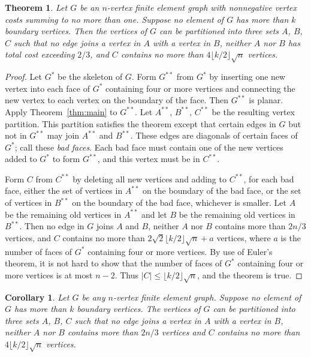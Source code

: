 \documentclass[12pt]{article}
\newtheorem{theorem}{Theorem}
\newtheorem{corollary}{Corollary}
\theoremstyle{remark}
\begin{document}
\begin{theorem}
\label{thm:finite-element}
Let $G$ be an $n$-vertex finite element graph with nonnegative vertex costs summing
to no more than one. Suppose no element of $G$ has more than $k$ boundary vertices.
Then the vertices of $G$ can be partitioned into three sets $A$, $B$, $C$ such that
no edge joins a vertex in $A$ with a vertex in $B$, neither $A$ nor $B$ has total
cost exceeding $2/3$, and $C$ contains no more than $4\lfloor k/2 \rfloor\sqrt{n}$
vertices.
\end{theorem}

\begin{proof}
Let $G^*$ be the skeleton of $G$. Form $G^{**}$ from $G^*$ by inserting one new
vertex into each face of $G^*$ containing four or more vertices and connecting the
new vertex to each vertex on the boundary of the face. Then $G^{**}$ is planar.
Apply Theorem~\ref{thm:main} to $G^{**}$. Let $A^{**}$, $B^{**}$, $C^{**}$ be the
resulting vertex partition. This partition satisfies the theorem except that certain
edges in $G$ but not in $G^{**}$ may join $A^{**}$ and $B^{**}$. These edges are
diagonals of certain faces of $G^*$; call these \emph{bad faces}. Each bad face must
contain one of the new vertices added to $G^*$ to form $G^{**}$, and this vertex
must be in $C^{**}$.

Form $C$ from $C^{**}$ by deleting all new vertices and adding to $C^{**}$, for
each bad face, either the set of vertices in $A^{**}$ on the boundary of the bad
face, or the set of vertices in $B^{**}$ on the boundary of the bad face, whichever
is smaller. Let $A$ be the remaining old vertices in $A^{**}$ and let $B$ be the
remaining old vertices in $B^{**}$. Then no edge in $G$ joins $A$ and $B$, neither
$A$ nor $B$ contains more than $2n/3$ vertices, and $C$ contains no more than
$2\sqrt{2}\lfloor k/2\rfloor\sqrt{n} + a$ vertices, where $a$ is the number of faces
of $G^*$ containing four or more vertices. By use of Euler's theorem, it is not hard
to show that the number of faces of $G^*$ containing four or more vertices is at most
$n - 2$. Thus $|C| \leq \lfloor k/2\rfloor\sqrt{n}$, and the theorem is true.
\end{proof}

\begin{corollary}
\label{cor:finite-element}
Let $G$ be any $n$-vertex finite element graph. Suppose no element of $G$ has more
than $k$ boundary vertices. The vertices of $G$ can be partitioned into three sets
$A$, $B$, $C$ such that no edge joins a vertex in $A$ with a vertex in $B$, neither
$A$ nor $B$ contains more than $2n/3$ vertices and $C$ contains no more than
$4\lfloor k/2\rfloor\sqrt{n}$ vertices.
\end{corollary}
\end{document}

